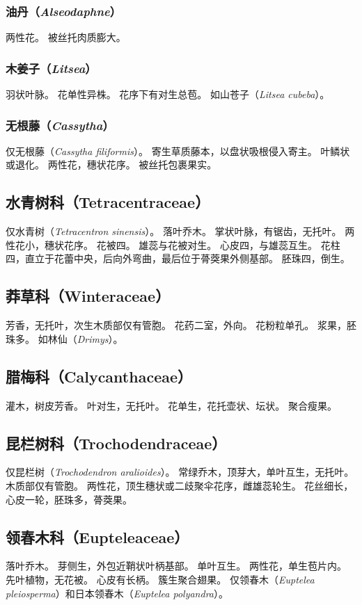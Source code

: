 \documentclass[11pt]{article}
\begin{document}
\begin{sloppypar}
\subsubsection{油丹（\textit{Alseodaphne}）}
两性花。
被丝托肉质膨大。

\subsubsection{木姜子（\textit{Litsea}）}
羽状叶脉。
花单性异株。
花序下有对生总苞。
如山苍子（\textit{Litsea cubeba}）。

\subsubsection{无根藤（\textit{Cassytha}）}
仅无根藤（\textit{Cassytha filiformis}）。
寄生草质藤本，以盘状吸根侵入寄主。
叶鳞状或退化。
两性花，穗状花序。
被丝托包裹果实。

\subsection{水青树科（Tetracentraceae）}
仅水青树（\textit{Tetracentron sinensis}）。
落叶乔木。
掌状叶脉，有锯齿，无托叶。
两性花小，穗状花序。
花被四。
雄蕊与花被对生。
心皮四，与雄蕊互生。
花柱四，直立于花蕾中央，后向外弯曲，最后位于蓇葖果外侧基部。
胚珠四，倒生。

\subsection{莽草科（Winteraceae）}
芳香，无托叶，次生木质部仅有管胞。
花药二室，外向。
花粉粒单孔。
浆果，胚珠多。
如林仙（\textit{Drimys}）。

\subsection{腊梅科（Calycanthaceae）}
灌木，树皮芳香。
叶对生，无托叶。
花单生，花托壶状、坛状。
聚合瘦果。

\subsection{昆栏树科（Trochodendraceae）}
仅昆栏树（\textit{Trochodendron aralioides}）。
常绿乔木，顶芽大，单叶互生，无托叶。
木质部仅有管胞。
两性花，顶生穗状或二歧聚伞花序，雌雄蕊轮生。
花丝细长，心皮一轮，胚珠多，蓇葖果。

\subsection{领春木科（Eupteleaceae）}
落叶乔木。
芽侧生，外包近鞘状叶柄基部。
单叶互生。
两性花，单生苞片内。
先叶植物，无花被。
心皮有长柄。
簇生聚合翅果。
仅领春木（\textit{Euptelea pleiosperma}）和日本领春木（\textit{Euptelea polyandra}）。


\end{sloppypar}
\end{document}
